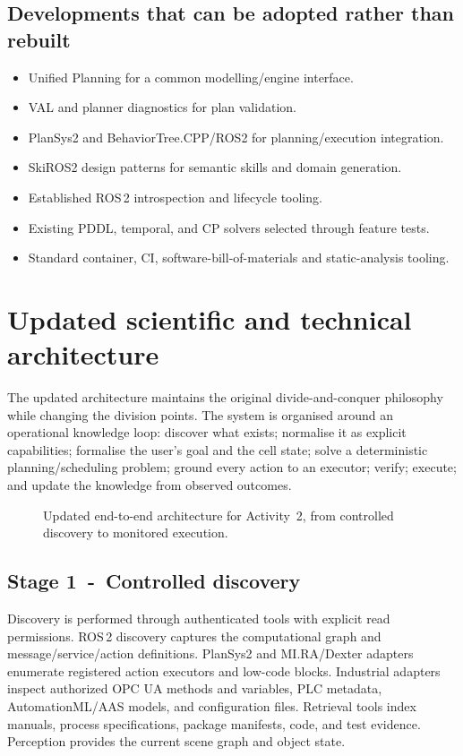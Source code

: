 \documentclass{plan4ari_report}
\begin{document}
\subsection{Developments that can be adopted rather than rebuilt}
\begin{itemize}
\item Unified Planning for a common modelling/engine interface.
\item VAL and planner diagnostics for plan validation.
\item PlanSys2 and BehaviorTree.CPP/ROS2 for planning/execution integration.
\item SkiROS2 design patterns for semantic skills and domain generation.
\item Established ROS\,2 introspection and lifecycle tooling.
\item Existing PDDL, temporal, and CP solvers selected through feature tests.
\item Standard container, CI, software-bill-of-materials and static-analysis tooling.
\end{itemize}

\section{Updated scientific and technical architecture}\label{sec:arch}

The updated architecture maintains the original divide-and-conquer philosophy while changing the division points. The system is organised around an operational knowledge loop: discover what exists; normalise it as explicit capabilities; formalise the user's goal and the cell state; solve a deterministic planning/scheduling problem; ground every action to an executor; verify; execute; and update the knowledge from observed outcomes.

\begin{figure}[htbp]
\centering

\caption{Updated end-to-end architecture for Activity~2, from controlled discovery to monitored execution.}\label{fig:architecture}
\end{figure}

\subsection{Stage 1~-~Controlled discovery}\label{sec:discovery}
Discovery is performed through authenticated tools with explicit read permissions. ROS\,2 discovery captures the computational graph and message/service/action definitions. PlanSys2 and MI.RA/Dexter adapters enumerate registered action executors and low-code blocks. Industrial adapters inspect authorized OPC UA methods and variables, PLC metadata, AutomationML/AAS models, and configuration files. Retrieval tools index manuals, process specifications, package manifests, code, and test evidence. Perception provides the current scene graph and object state.
\end{document}
